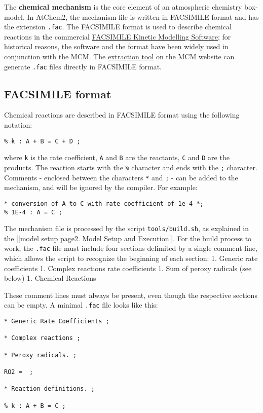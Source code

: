 The \textbf{chemical mechanism} is the core element of an atmospheric
chemistry box-model. In AtChem2, the mechanism file is written in
FACSIMILE format and has the extension \texttt{.fac}. The FACSIMILE
format is used to describe chemical reactions in the commercial
\href{http://www.mcpa-software.com/}{FACSIMILE Kinetic Modelling
Software}; for historical reasons, the software and the format have been
widely used in conjunction with the MCM. The
\href{http://mcm.leeds.ac.uk/MCMv3.3.1/extract.htt}{extraction tool} on
the MCM website can generate \texttt{.fac} files directly in FACSIMILE
format.

\hypertarget{facsimile-format}{%
\subsection{FACSIMILE format}\label{facsimile-format}}

Chemical reactions are described in FACSIMILE format using the following
notation:

\begin{verbatim}
% k : A + B = C + D ;
\end{verbatim}

where \texttt{k} is the rate coefficient, \texttt{A} and \texttt{B} are
the reactants, \texttt{C} and \texttt{D} are the products. The reaction
starts with the \texttt{\%} character and ends with the \texttt{;}
character. Comments - enclosed between the characters \texttt{*} and
\texttt{;} - can be added to the mechanism, and will be ignored by the
compiler. For example:

\begin{verbatim}
* conversion of A to C with rate coefficient of 1e-4 *;
% 1E-4 : A = C ;
\end{verbatim}

The mechanism file is processed by the script \texttt{tools/build.sh},
as explained in the {[}{[}model setup page\textbar{}2. Model Setup and
Execution{]}{]}. For the build process to work, the \texttt{.fac} file
must include four sections delimited by a single comment line, which
allows the script to recognize the beginning of each section: 1. Generic
rate coefficients 1. Complex reactions rate coefficients 1. Sum of
peroxy radicals (see below) 1. Chemical Reactions

These comment lines must always be present, even though the respective
sections can be empty. A minimal \texttt{.fac} file looks like this:

\begin{verbatim}
* Generic Rate Coefficients ;

* Complex reactions ;

* Peroxy radicals. ;

RO2 =  ;

* Reaction definitions. ;

% k : A + B = C ;
\end{verbatim}

